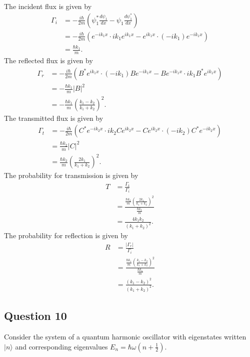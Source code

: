 \documentclass{article}
\begin{document}
The incident flux is given by
\begin{align*}
\Gamma_i &= -\frac{i\hbar}{2m} \left( \psi_1^* \frac{d\psi_1}{dx} - \psi_1 \frac{d\psi_1^*}{dx} \right) \\
&= -\frac{i\hbar}{2m} \left( e^{-ik_1x} \cdot ik_1e^{ik_1x} - e^{ik_1x} \cdot (-ik_1)e^{-ik_1x} \right) \\
&= \frac{\hbar k_1}{m}.
\end{align*}
The reflected flux is given by
\begin{align*}
\Gamma_r &= -\frac{i\hbar}{2m} \left( B^*e^{ik_1x} \cdot (-ik_1)Be^{-ik_1x} - Be^{-ik_1x} \cdot ik_1B^*e^{ik_1x} \right) \\
&= -\frac{\hbar k_1}{m}|B|^2 \\
&= -\frac{\hbar k_1}{m} \left( \frac{k_1 - k_2}{k_1 + k_2} \right)^2.
\end{align*}
The transmitted flux is given by
\begin{align*}
\Gamma_t &= -\frac{i\hbar}{2m} \left( C^*e^{-ik_2x} \cdot ik_2Ce^{ik_2x} - Ce^{ik_2x} \cdot (-ik_2)C^*e^{-ik_2x} \right) \\
&= \frac{\hbar k_2}{m}|C|^2 \\
&= \frac{\hbar k_2}{m} \left( \frac{2k_1}{k_1 + k_2} \right)^2.
\end{align*}
The probability for transmission is given by
\begin{align*}
T &= \frac{\Gamma_t}{\Gamma_i} \\
&= \frac{\frac{\hbar k_2}{m} \left( \frac{2k_1}{k_1 + k_2} \right)^2}{\frac{\hbar k_1}{m}} \\
&= \frac{4k_1k_2}{(k_1 + k_2)^2}.
\end{align*}
The probability for reflection is given by
\begin{align*}
R &= \frac{|\Gamma_r|}{\Gamma_i} \\
&= \frac{\frac{\hbar k_1}{m} \left( \frac{k_1 - k_2}{k_1 + k_2} \right)^2}{\frac{\hbar k_1}{m}} \\
&= \frac{(k_1 - k_2)^2}{(k_1 + k_2)^2}.
\end{align*}


\subsection{Question 10}

Consider the system of a quantum harmonic oscillator with eigenstates written \(|n\rangle\) and corresponding eigenvalues \(E_n = \hbar\omega(n + \frac{1}{2})\). 
\end{document}
